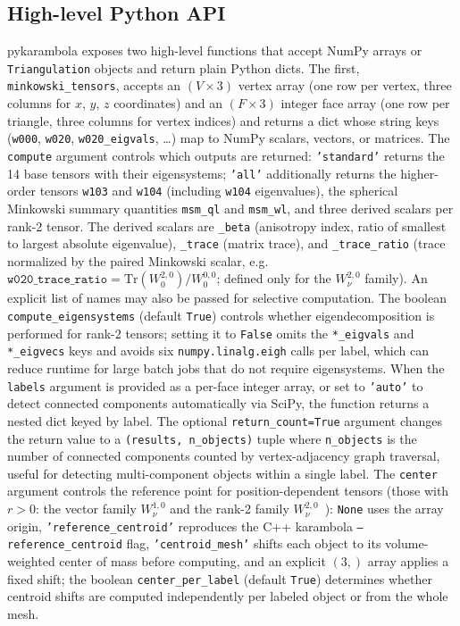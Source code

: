 \documentclass[times, twoside, watermark]{zHenriquesLab-StyleBioRxiv}
\begin{document}
\subsection*{High-level Python API}
pykarambola exposes two high-level functions that accept NumPy arrays or \texttt{Triangulation} objects and return plain Python dicts.
The first, \texttt{minkowski\_tensors}, accepts an $(V \times 3)$ vertex array (one row per vertex, three columns for $x$, $y$, $z$ coordinates) and an $(F \times 3)$ integer face array (one row per triangle, three columns for vertex indices) and returns a dict whose string keys (\texttt{w000}, \texttt{w020}, \texttt{w020\_eigvals}, \ldots) map to NumPy scalars, vectors, or matrices.
The \texttt{compute} argument controls which outputs are returned: \texttt{'standard'} returns the 14 base tensors with their eigensystems; \texttt{'all'} additionally returns the higher-order tensors \texttt{w103} and \texttt{w104} (including \texttt{w104} eigenvalues), the spherical Minkowski summary quantities \texttt{msm\_ql} and \texttt{msm\_wl}, and three derived scalars per rank-2 tensor.
The derived scalars are \texttt{\_beta} (anisotropy index, ratio of smallest to largest absolute eigenvalue), \texttt{\_trace} (matrix trace), and \texttt{\_trace\_ratio} (trace normalized by the paired Minkowski scalar, e.g.\ $\texttt{w020\_trace\_ratio} = \mathrm{Tr}(W_0^{2,0})/W_0^{0,0}$; defined only for the $W_\nu^{2,0}$ family).
An explicit list of names may also be passed for selective computation.
The boolean \texttt{compute\_eigensystems} (default \texttt{True}) controls whether eigendecomposition is performed for rank-2 tensors; setting it to \texttt{False} omits the \texttt{*\_eigvals} and \texttt{*\_eigvecs} keys and avoids six \texttt{numpy.linalg.eigh} calls per label, which can reduce runtime for large batch jobs that do not require eigensystems.
When the \texttt{labels} argument is provided as a per-face integer array, or set to \texttt{'auto'} to detect connected components automatically via SciPy, the function returns a nested dict keyed by label.
The optional \texttt{return\_count=True} argument changes the return value to a \texttt{(results, n\_objects)} tuple where \texttt{n\_objects} is the number of connected components counted by vertex-adjacency graph traversal, useful for detecting multi-component objects within a single label.
The \texttt{center} argument controls the reference point for position-dependent tensors (those with $r > 0$: the vector family $W_\nu^{1,0}$ and the rank-2 family $W_\nu^{2,0}$~\cite{SchroderTurk2013}): \texttt{None} uses the array origin, \texttt{'reference\_centroid'} reproduces the C++ karambola \texttt{--reference\_centroid} flag, \texttt{'centroid\_mesh'} shifts each object to its volume-weighted center of mass before computing, and an explicit $(3,)$ array applies a fixed shift; the boolean \texttt{center\_per\_label} (default \texttt{True}) determines whether centroid shifts are computed independently per labeled object or from the whole mesh.
\end{document}
